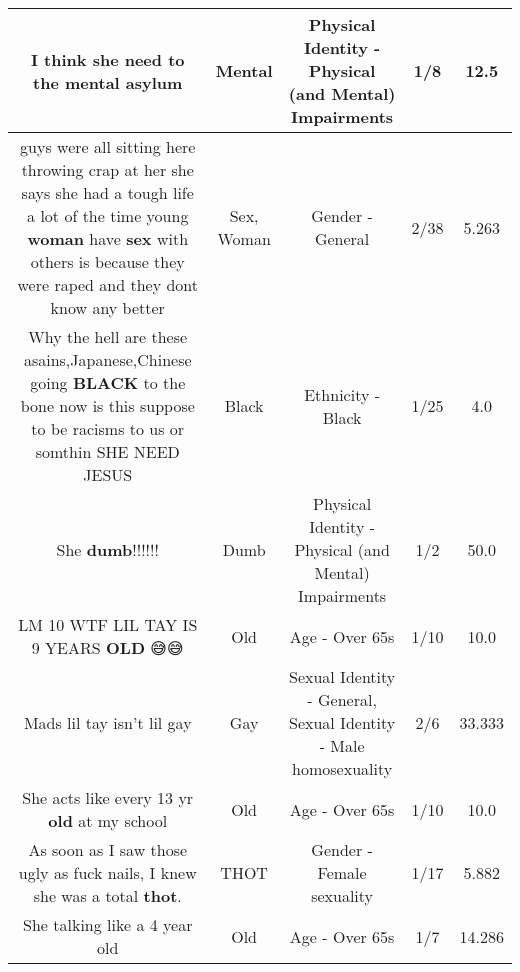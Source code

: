 \documentclass[11pt]{article}
\newlength\mylength
\begin{document}
\begin{center}
\begin{longtable}{|C{.65\mylength}|C{.30\mylength}|C{.12\mylength}|C{.12\mylength}|C{.12\mylength}|}
  \small I think she need to the \textbf{mental} asylum\normalsize   & Mental & Physical Identity - Physical (and Mental) Impairments & 1/8 & 12.5 \\  \hline
  \small guys were all sitting here throwing crap at her she says she had a tough life a lot of the time young \textbf{woman} have \textbf{sex} with others is because they were raped and they dont know any better\normalsize   & Sex, Woman & Gender - General & 2/38 & 5.263 \\  \hline
  \small Why the hell are these asains,Japanese,Chinese going \textbf{BLACK} to the bone now is this suppose to be racisms to us or somthin SHE NEED JESUS\normalsize   & Black & Ethnicity - Black & 1/25 & 4.0 \\  \hline
  \small She \textbf{dumb}!!!!!!\normalsize   & Dumb & Physical Identity - Physical (and Mental) Impairments & 1/2 & 50.0 \\  \hline
  \small LM 10 WTF LIL TAY IS 9 YEARS \textbf{OLD} 😅😅\normalsize   & Old & Age - Over 65s & 1/10 & 10.0 \\  \hline
  \small Mads lil tay isn't lil gay\normalsize   & Gay & Sexual Identity - General, Sexual Identity - Male homosexuality & 2/6 & 33.333 \\  \hline
  \small She acts like every 13 yr \textbf{old} at my school\normalsize   & Old & Age - Over 65s & 1/10 & 10.0 \\  \hline
  \small As soon as I saw those ugly as fuck nails, I knew she was a total \textbf{thot}.\normalsize   & THOT & Gender - Female sexuality & 1/17 & 5.882 \\  \hline
  \small She talking like a 4 year old\normalsize   & Old & Age - Over 65s & 1/7 & 14.286 \\  \hline

\end{longtable}
\end{center}
\end{document}
